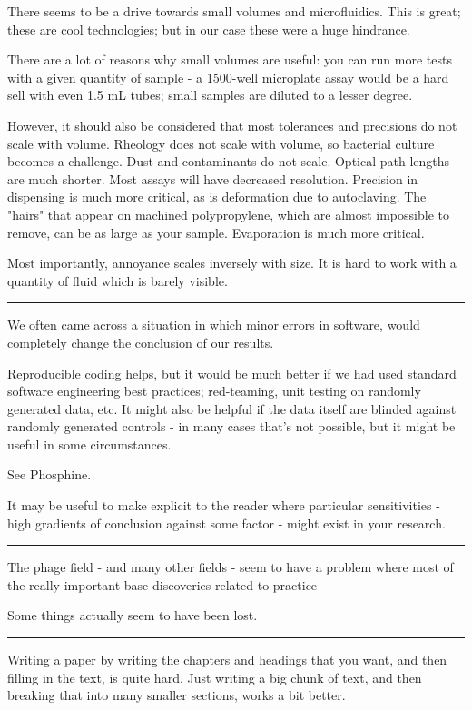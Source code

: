 \documentclass[paper.tex]{subfiles}
\begin{document}
There seems to be a drive towards small volumes and microfluidics. This is great; these are cool technologies; but in our case these were a huge hindrance.

There are a lot of reasons why small volumes are useful: you can run more tests with a given quantity of sample - a 1500-well microplate assay would be a hard sell with even 1.5 mL tubes; small samples are diluted to a lesser degree. 

However, it should also be considered that most tolerances and precisions do not scale with volume. 
Rheology does not scale with volume, so bacterial culture becomes a challenge. Dust and contaminants do not scale. Optical path lengths are much shorter. Most assays will have decreased resolution. Precision in dispensing is much more critical, as is deformation due to autoclaving. The "hairs" that appear on machined polypropylene, which are almost impossible to remove, can be as large as your sample. Evaporation is much more critical.

Most importantly, annoyance scales inversely with size. It is hard to work with a quantity of fluid which is barely visible.

\rule{\linewidth}{0.2pt}

We often came across a situation in which minor errors in software,  would completely change the conclusion of our results.

Reproducible coding helps, but it would be much better if we had used standard software engineering best practices; red-teaming, unit testing on randomly generated data, etc. It might also be helpful if the data itself are blinded against randomly generated controls - in many cases that's not possible, but it might be useful in some circumstances.

See Phosphine.

It may be useful to make explicit to the reader where particular sensitivities - high gradients of conclusion against some factor - might exist in your research.

\rule{\linewidth}{0.2pt}

The phage field - and many other fields - seem to have a problem where most of the really important base discoveries related to practice - 

Some things actually seem to have been lost.

\rule{\linewidth}{0.2pt}

Writing a paper by writing the chapters and headings that you want, and then filling in the text, is quite hard. Just writing a big chunk of text, and then breaking that into many smaller sections, works a bit better.
\end{document}

